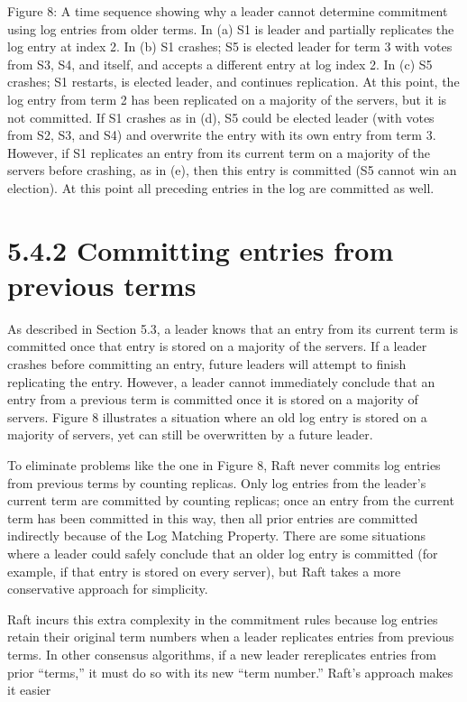 \documentclass[
]{article}
\begin{document}
Figure 8: A time sequence showing why a leader cannot determine
commitment using log entries from older terms. In (a) S1 is leader and
partially replicates the log entry at index 2. In (b) S1 crashes; S5 is
elected leader for term 3 with votes from S3, S4, and itself, and
accepts a different entry at log index 2. In (c) S5 crashes; S1
restarts, is elected leader, and continues replication. At this point,
the log entry from term 2 has been replicated on a majority of the
servers, but it is not committed. If S1 crashes as in (d), S5 could be
elected leader (with votes from S2, S3, and S4) and overwrite the entry
with its own entry from term 3. However, if S1 replicates an entry from
its current term on a majority of the servers before crashing, as in
(e), then this entry is committed (S5 cannot win an election). At this
point all preceding entries in the log are committed as well.

\section{5.4.2 Committing entries from previous
terms}\label{committing-entries-from-previous-terms}

As described in Section 5.3, a leader knows that an entry from its
current term is committed once that entry is stored on a majority of the
servers. If a leader crashes before committing an entry, future leaders
will attempt to finish replicating the entry. However, a leader cannot
immediately conclude that an entry from a previous term is committed
once it is stored on a majority of servers. Figure 8 illustrates a
situation where an old log entry is stored on a majority of servers, yet
can still be overwritten by a future leader.

To eliminate problems like the one in Figure 8, Raft never commits log
entries from previous terms by counting replicas. Only log entries from
the leader's current term are committed by counting replicas; once an
entry from the current term has been committed in this way, then all
prior entries are committed indirectly because of the Log Matching
Property. There are some situations where a leader could safely conclude
that an older log entry is committed (for example, if that entry is
stored on every server), but Raft takes a more conservative approach for
simplicity.

Raft incurs this extra complexity in the commitment rules because log
entries retain their original term numbers when a leader replicates
entries from previous terms. In other consensus algorithms, if a new
leader rereplicates entries from prior ``terms,'' it must do so with its
new ``term number.'' Raft's approach makes it easier
\end{document}
